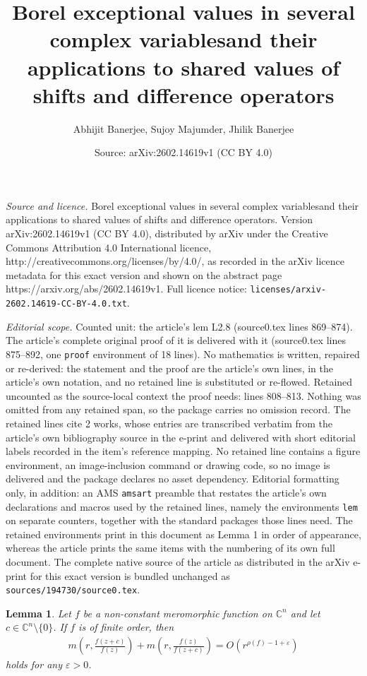 \documentclass[10pt,a4paper]{amsart}
\title{\LARGE B\Large\MakeLowercase{orel Exceptional Values in Several Complex Variables\newline and Their Applications to Shared Values of Shifts\newline \vspace {.25cc} and Difference Operators}}
\author{Abhijit Banerjee, Sujoy Majumder, Jhilik Banerjee}
\date{Source: arXiv:2602.14619v1 (CC BY 4.0)}
\newtheorem{lem}{Lemma}
\begin{document}
\maketitle

\noindent\emph{Source and licence.} \LARGE B\Large\MakeLowercase{orel Exceptional Values in Several Complex Variables\newline and Their Applications to Shared Values of Shifts\newline \vspace {.25cc} and Difference Operators}. Version arXiv:2602.14619v1 (CC BY 4.0), distributed by arXiv under the Creative Commons Attribution 4.0 International licence, http://creativecommons.org/licenses/by/4.0/, as recorded in the arXiv licence metadata for this exact version and shown on the abstract page https://arxiv.org/abs/2602.14619v1. Full licence notice: \texttt{licenses/arxiv-2602.14619-CC-BY-4.0.txt}.\par\smallskip

\noindent\textit{Editorial scope.} Counted unit: the article's lem L2.8 (source0.tex lines 869--874). The article's complete original proof of it is delivered with it (source0.tex lines 875--892, one \texttt{proof} environment of 18 lines). No mathematics is written, repaired or re-derived: the statement and the proof are the article's own lines, in the article's own notation, and no retained line is substituted or re-flowed.  Retained uncounted as the source-local context the proof needs: lines 808--813.  Nothing was omitted from any retained span, so the package carries no omission record.  The retained lines cite 2 works, whose entries are transcribed verbatim from the article's own bibliography source in the e-print and delivered with short editorial labels recorded in the item's reference mapping.  No retained line contains a figure environment, an image-inclusion command or drawing code, so no image is delivered and the package declares no asset dependency.  Editorial formatting only, in addition: an AMS \texttt{amsart} preamble that restates the article's own declarations and macros used by the retained lines, namely the environments \texttt{lem} on separate counters, together with the standard packages those lines need.  The retained environments print in this document as Lemma 1 in order of appearance, whereas the article prints the same items with the numbering of its own full document.  The complete native source of the article as distributed in the arXiv e-print for this exact version is bundled unchanged as \texttt{sources/194730/source0.tex}.
\begin{lem}\label{L2.1}\cite[Theorem 2.4]{Cao-Xu-2020} Let $f$ be a non-constant meromorphic function on $\mathbb{C}^n$ and let $c \in \mathbb{C}^n\setminus \{0\} $. If $f$ is of finite order, then 
\begin{align*}
 m\left(r,\frac{f(z+c)}{f(z)}\right)+m\left(r, \frac{f(z)}{f(z+c)}\right)=O\left(r^{\rho(f)-1+\varepsilon}\right)
 \end{align*}
holds for any $\varepsilon>0$.
\end{lem}
\end{document}
